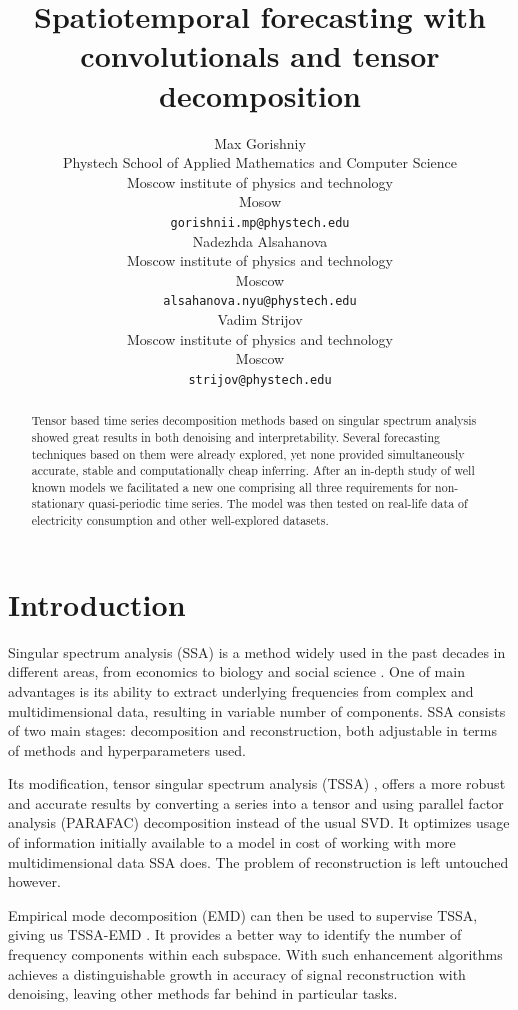 \documentclass{article}
\title{Spatiotemporal forecasting with convolutionals and tensor decomposition}
\author{ Max Gorishniy \\
	Phystech School of Applied Mathematics and Computer Science\\
	Moscow institute of physics and technology\\
	Mosow \\
	\texttt{gorishnii.mp@phystech.edu} \\
	\And
	Nadezhda Alsahanova \\
	Moscow institute of physics and technology \\
	Moscow \\
	\texttt{alsahanova.nyu@phystech.edu} \\
	\And
	Vadim Strijov \\
	Moscow institute of physics and technology \\
	Moscow \\
	\texttt{strijov@phystech.edu} \\
}
\date{}
\begin{document}
\maketitle

\begin{abstract}
Tensor based time series decomposition methods based on singular spectrum analysis showed great results in both denoising and interpretability. Several forecasting techniques based on them were already explored, yet none provided simultaneously accurate, stable and computationally cheap inferring. After an in-depth study of well known models we facilitated a new one comprising all three requirements for non-stationary quasi-periodic time series. The model was then tested on real-life data of electricity consumption and other well-explored datasets. 
\end{abstract}



\section{Introduction}
Singular spectrum analysis (SSA) is a method widely used in the past decades in different areas, from economics to biology and social science \cite{golyandina2020}.  One of main advantages is its ability to extract underlying frequencies from complex and multidimensional data, resulting in  variable number of components. SSA consists of two main stages: decomposition and reconstruction, both adjustable in terms of methods and hyperparameters used.

Its modification, tensor singular spectrum analysis (TSSA) \cite{kouchaki2013}, offers a more robust and accurate results by converting a series into a tensor and using  parallel factor analysis (PARAFAC) decomposition instead of the usual SVD. It optimizes usage of information initially available to a model in cost of working with more multidimensional data SSA does. The problem of reconstruction is left untouched however.

Empirical mode decomposition (EMD) can then be used  to supervise TSSA, giving us TSSA-EMD \cite{kouchaki2015}. It provides a better way to identify the number of frequency components within each subspace. With such enhancement algorithms achieves \cite{kouchaki2015} a distinguishable growth in accuracy of signal reconstruction with denoising, leaving other methods far behind in particular tasks.
\end{document}
